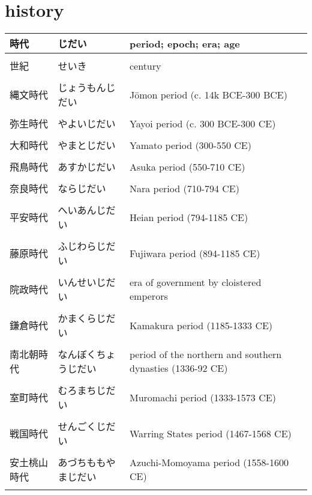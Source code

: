 \documentclass{article}
\newcommand\tabni[1][0.2cm]{\hspace*{#1}}
\begin{document}
\section{ \tabni history}
\begin{tabular}{ l | l | p{10.5cm} }
時代       	&じだい 			&period; epoch; era; age \\ \hline \\[-1em]
世紀       	&せいき 			&century	\\ \hline \\[-1em]
縄文時代		&じょうもんじだい		&Jōmon period (c. 14k BCE-300 BCE)\\ \hline \\[-1em]
弥生時代		&やよいじだい		&Yayoi period (c. 300 BCE-300 CE) \\ \hline \\[-1em]
大和時代		&やまとじだい		&Yamato period (300-550 CE) \\ \hline \\[-1em]
飛鳥時代		&あすかじだい		&Asuka period (550-710 CE) \\ \hline \\[-1em]
奈良時代		&ならじだい			&Nara period (710-794 CE) \\ \hline \\[-1em]
平安時代		&へいあんじだい		&Heian period (794-1185 CE) \\ \hline \\[-1em]
藤原時代		&ふじわらじだい		&Fujiwara period (894-1185 CE) \\ \hline \\[-1em]
院政時代		&いんせいじだい		&era of government by cloistered emperors \\ \hline \\[-1em]
鎌倉時代		&かまくらじだい		&Kamakura period (1185-1333 CE) \\ \hline \\[-1em]
南北朝時代	&なんぼくちょうじだい	&period of the northern and southern dynasties (1336-92 CE) \\ \hline \\[-1em]
室町時代		&むろまちじだい		&Muromachi period (1333-1573 CE) \\ \hline \\[-1em]
戦国時代		&せんごくじだい		&Warring States period (1467-1568 CE) \\ \hline \\[-1em]
安土桃山時代	&あづちももやまじだい	&Azuchi-Momoyama period (1558-1600 CE) \\ \hline \\[-1em]

\end{tabular}
\end{document}
